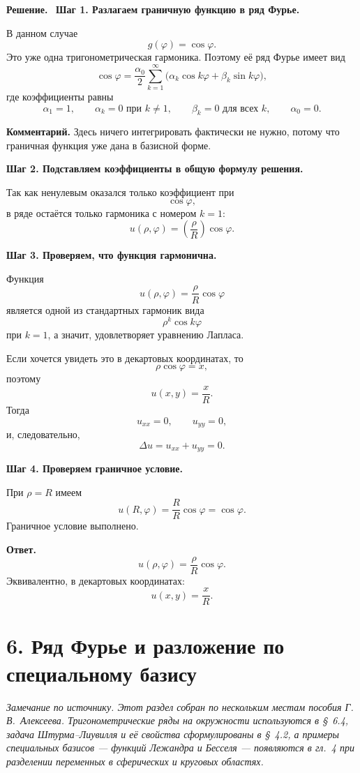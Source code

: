 \documentclass[a4paper,12pt]{article}
\newcommand{\Solution}{\textbf{Решение.}\ }
\begin{document}
\Solution
\textbf{Шаг 1. Разлагаем граничную функцию в ряд Фурье.}

В данном случае
\[
g(\varphi)=\cos\varphi.
\]
Это уже одна тригонометрическая гармоника. Поэтому её ряд Фурье имеет вид
\[
\cos\varphi=\frac{\alpha_0}{2}
\sum_{k=1}^{\infty}
\bigl(\alpha_k\cos k\varphi+\beta_k\sin k\varphi\bigr),
\]
где коэффициенты равны
\[
\alpha_1=1,
\qquad
\alpha_k=0 \text{ при } k\ne 1,
\qquad
\beta_k=0 \text{ для всех } k,
\qquad
\alpha_0=0.
\]

\textbf{Комментарий.} Здесь ничего интегрировать фактически не нужно, потому что граничная функция уже дана в базисной форме.

\textbf{Шаг 2. Подставляем коэффициенты в общую формулу решения.}

Так как ненулевым оказался только коэффициент при
\[
\cos\varphi,
\]
в ряде остаётся только гармоника с номером $k=1$:
\[
u(\rho,\varphi)
=
\left(\frac{\rho}{R}\right)\cos\varphi.
\]

\textbf{Шаг 3. Проверяем, что функция гармонична.}

Функция
\[
u(\rho,\varphi)=\frac{\rho}{R}\cos\varphi
\]
является одной из стандартных гармоник вида
\[
\rho^k\cos k\varphi
\]
при $k=1$, а значит, удовлетворяет уравнению Лапласа.

Если хочется увидеть это в декартовых координатах, то
\[
\rho\cos\varphi=x,
\]
поэтому
\[
u(x,y)=\frac{x}{R}.
\]
Тогда
\[
u_{xx}=0,
\qquad
u_{yy}=0,
\]
и, следовательно,
\[
\Delta u=u_{xx}+u_{yy}=0.
\]

\textbf{Шаг 4. Проверяем граничное условие.}

При $\rho=R$ имеем
\[
u(R,\varphi)=\frac{R}{R}\cos\varphi=\cos\varphi.
\]
Граничное условие выполнено.

\textbf{Ответ.}
\[
u(\rho,\varphi)=\frac{\rho}{R}\cos\varphi.
\]
Эквивалентно, в декартовых координатах:
\[
u(x,y)=\frac{x}{R}.
\]

\section*{6. Ряд Фурье и разложение по специальному базису}

\textit{Замечание по источнику. Этот раздел собран по нескольким местам пособия Г.\,В.~Алексеева.
Тригонометрические ряды на окружности используются в \S~6.4,
задача Штурма--Лиувилля и её свойства сформулированы в \S~4.2,
а примеры специальных базисов --- функций Лежандра и Бесселя ---
появляются в гл.~4 при разделении переменных в сферических и круговых областях.}
\end{document}
